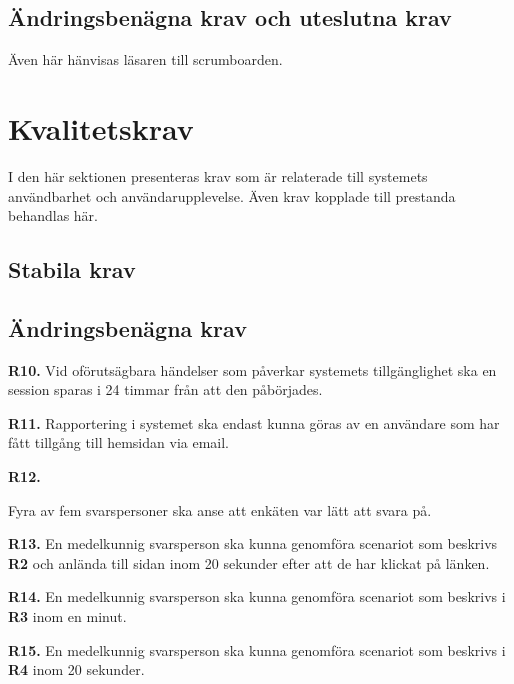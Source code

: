 \documentclass{article}
\begin{document}
    
    \subsection{Ändringsbenägna krav och uteslutna krav}
    Även här hänvisas läsaren till scrumboarden.
    
  \newpage
   
    \section{Kvalitetskrav}
\normalsize{I den här sektionen presenteras krav som är relaterade till systemets användbarhet och användarupplevelse. Även krav kopplade till prestanda behandlas här.
}
    \subsection{Stabila krav}
    
  
\subsection{Ändringsbenägna krav}
     \noindent \large{\textbf{R10.}}
    \normalsize{Vid oförutsägbara händelser som påverkar systemets tillgänglighet ska en session sparas i 24 timmar från att den påbörjades.}

\vspace{1em}

    \noindent \large{\textbf{R11.}}
    \normalsize{Rapportering i systemet ska endast kunna göras av en användare som har fått tillgång till hemsidan via email.
    }
    
\vspace{1em}
\noindent \large{\textbf{R12.}}
    \normalsize{Fyra av fem svarspersoner ska anse att enkäten var lätt att svara på.
    
    }
    \vspace{1em}
    
\noindent \large{\textbf{R13.}}
\normalsize{En medelkunnig svarsperson ska kunna genomföra scenariot som beskrivs  \textbf{R2} och anlända till sidan inom 20 sekunder efter att de har klickat på länken.
    }
\vspace{1em}

\noindent \large{\textbf{R14.}}
    \normalsize{En medelkunnig svarsperson ska kunna genomföra scenariot som beskrivs i \textbf{R3} inom en minut.
    }
    \vspace{1em}
    
\noindent \large{\textbf{R15.}}
    \normalsize{En medelkunnig svarsperson ska kunna genomföra scenariot som beskrivs i \textbf{R4} inom 20 sekunder.
    }
    
\end{document}
